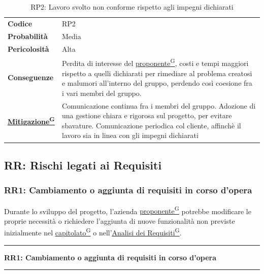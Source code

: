 \documentclass[a4paper,12pt]{article}
\providecommand{\glslink}[2]{\href{https://alittlebyte-19.github.io/Documentazione/glossario.html\#gls-#1}{\underline{#2}\textsuperscript{\scriptsize G}}}
\begin{document}
\begin{table}[h]

\begin{tabular}{>{\bfseries}p{3cm} | p{12.2cm}}
Codice & RP2 \\

Probabilità & Media\\

Pericolosità & Alta\\

Conseguenze & Perdita di interesse del \glslink{committente-proponente}{proponente}, costi e tempi maggiori rispetto a quelli dichiarati per rimediare al problema creatosi e malumori
all'interno del gruppo, perdendo così coesione fra i vari membri del gruppo.\\

\glslink{mitigazione-dei-rischi}{Mitigazione} & Comunicazione continua fra i membri del gruppo. Adozione di una gestione chiara e rigorosa sul progetto, per evitare sbavature. Comunicazione periodica col cliente, affinchè il lavoro
sia in linea con gli impegni dichiarati\\
\end{tabular}
\caption{RP2: Lavoro svolto non conforme rispetto agli impegni dichiarati}
\end{table}

\newpage
\subsection{RR: Rischi legati ai Requisiti}
\subsubsection{RR1: Cambiamento o aggiunta di requisiti in corso d'opera}
Durante lo sviluppo del progetto, l'azienda \glslink{committente-proponente}{proponente} potrebbe modificare le proprie necessità o richiedere l'aggiunta di nuove funzionalità non previste inizialmente nel \glslink{capitolato}{capitolato} o nell'\glslink{analisi-dei-requisiti-adr}{Analisi dei Requisiti}.

\vspace{0.5cm}
\hrule
\vspace{0.5em}
\textbf{RR1: Cambiamento o aggiunta di requisiti in corso d'opera}
\vspace{0.5em}
\hrule
\vspace{1cm}
\end{document}
